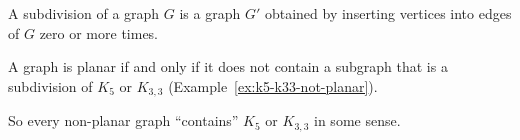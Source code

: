 A subdivision of a graph \(G\) is a graph \(G'\) obtained by inserting vertices into edges of \(G\) zero or more times.
\begin{theorem}[Kuratowski]\label{thm:kuratowski}
A graph is planar if and only if it does not contain a subgraph that is a subdivision of \(K_5\) or \(K_{3,3}\) (Example~\ref{ex:k5-k33-not-planar}).
\end{theorem}
So every non-planar graph ``contains'' \(K_5\) or \(K_{3,3}\) in some sense.








